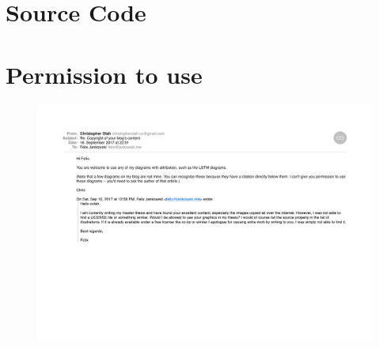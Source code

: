 \documentclass[a4paper,11pt,twoside]{scrbook}
\begin{document}
    \frontmatter
    \maketitle
    
    
    
    
    
    \tableofcontents
    \listoffigures


    \mainmatter
    
    

    \appendix
    
    \chapter{Source Code}
    \chapter{Permission to use}
    \begin{figure}[h]
    	\centering
		\includegraphics[width=\textwidth]{./images/permission-to-use}
	\end{figure}
\end{document}
